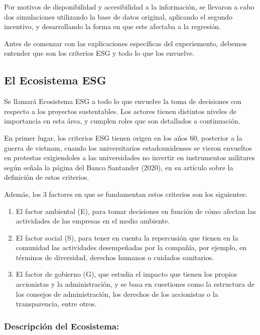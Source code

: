 \documentclass[11pt,letterpaper]{article}
\begin{document}
Por motivos de disponibilidad y accesibilidad a la información, se llevaron a cabo dos simulaciones utilizando la base de datos original, aplicando el segundo incentivo, y desarrollando la forma en que este afectaba a la regresión.

Antes de comenzar con las explicaciones específicas del experiemento, debemos entender que son los críterios ESG y todo lo que los envuelve.

\subsection{El Ecosistema ESG}

Se llamará Ecosistema ESG a todo lo que envuelve la toma de decisiones con respecto a los proyectos sustentables. Los actores tienen distintos niveles de importancia en esta área, y cumplen roles que son detallados a continuación. 

En primer lugar, los criterios ESG tienen origen en los años 60, posterior a la guerra de vietnam, cuando los universitarios estadounidenses se vieron envueltos en protestas exigiendoles a las universidades no invertir en instrumentos militares según señala la página del Banco Santander (2020), en su artículo sobre la definición de estos criterios. 

Además, los 3 factores en que se fundamentan estos criterios son los siguientes:

\begin{enumerate}

\item El factor ambiental (E), para tomar decisiones en función de cómo afectan las actividades de las empresas en el medio ambiente.
\item El factor social (S), para tener en cuenta la repercusión que tienen en la comunidad las actividades desempeñadas por la compañía, por ejemplo, en términos de diversidad, derechos humanos o cuidados sanitarios.
\item El factor de gobierno (G), que estudia el impacto que tienen los propios accionistas y la administración, y se basa en cuestiones como la estructura de los consejos de administración, los derechos de los accionistas o la transparencia, entre otros.

\end{enumerate}

\subsubsection{Descripción del Ecosistema:}
\end{document}
